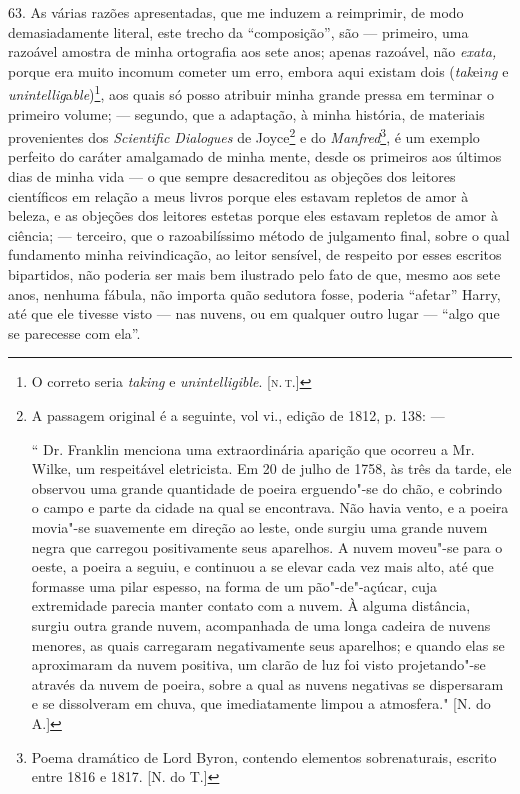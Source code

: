 63. As várias razões apresentadas, que me induzem a reimprimir, de modo
demasiadamente literal, este trecho da ``composição'', são --- primeiro,
uma razoável amostra de minha ortografia aos sete anos; apenas razoável,
não \emph{exata,} porque era muito incomum cometer um erro, embora aqui
existam dois (\emph{tak}ei\emph{ng} e
\emph{unintellig}a\emph{ble})\footnote{O correto seria \emph{taking} e
  \emph{unintelligible}. {[}\textsc{n.\,t.}{]}}, aos quais só posso atribuir
minha grande pressa em terminar o primeiro volume; --- segundo, que a
adaptação, à minha história, de materiais provenientes dos
\emph{Scientific Dialogues} de Joyce\footnote{A passagem original é a
  seguinte, vol vi., edição de 1812, p. 138: ---

  `` Dr. Franklin menciona uma extraordinária aparição que ocorreu a Mr.
  Wilke, um respeitável eletricista. Em 20 de julho de 1758, às três da
  tarde, ele observou uma grande quantidade de poeira erguendo"-se do
  chão, e cobrindo o campo e parte da cidade na qual se encontrava. Não
  havia vento, e a poeira movia"-se suavemente em direção ao leste, onde
  surgiu uma grande nuvem negra que carregou positivamente seus
  aparelhos. A nuvem moveu"-se para o oeste, a poeira a seguiu, e
  continuou a se elevar cada vez mais alto, até que formasse uma pilar
  espesso, na forma de um pão"-de"-açúcar, cuja extremidade parecia manter
  contato com a nuvem. À alguma distância, surgiu outra grande nuvem,
  acompanhada de uma longa cadeira de nuvens menores, as quais
  carregaram negativamente seus aparelhos; e quando elas se aproximaram
  da nuvem positiva, um clarão de luz foi visto projetando"-se através da
  nuvem de poeira, sobre a qual as nuvens negativas se dispersaram e se
  dissolveram em chuva, que imediatamente limpou a atmosfera." {[}N. do
  A.{]}} e do \emph{Manfred}\footnote{Poema dramático de Lord Byron,
  contendo elementos sobrenaturais, escrito entre 1816 e 1817. {[}N. do
  T.{]}}, é um exemplo perfeito do caráter amalgamado de minha mente,
desde os primeiros aos últimos dias de minha vida --- o que sempre
desacreditou as objeções dos leitores científicos em relação a meus
livros porque eles estavam repletos de amor à beleza, e as objeções dos
leitores estetas porque eles estavam repletos de amor à ciência; ---
terceiro, que o razoabilíssimo método de julgamento final, sobre o qual
fundamento minha reivindicação, ao leitor sensível, de respeito por
esses escritos bipartidos, não poderia ser mais bem ilustrado pelo fato
de que, mesmo aos sete anos, nenhuma fábula, não importa quão sedutora
fosse, poderia ``afetar'' Harry, até que ele tivesse visto --- nas
nuvens, ou em qualquer outro lugar --- ``algo que se parecesse com ela''.

